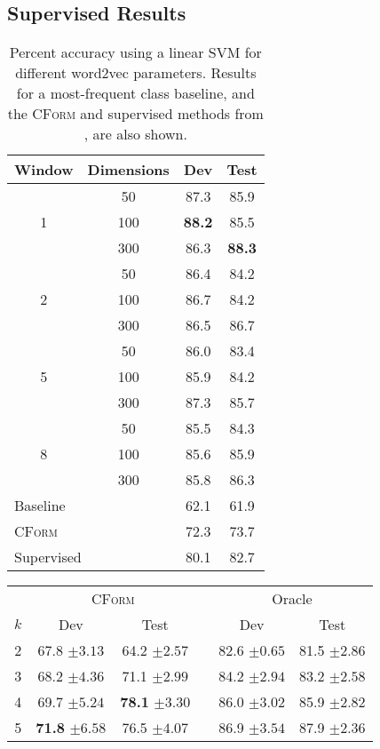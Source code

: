 \documentclass[11pt]{article}
\newcommand{\cform}{\textsc{CForm}\xspace}
\begin{document}
\subsection{Supervised Results}


\begin{table}
\centering
\begin{tabular}{cccc} \hline
Window & Dimensions & Dev & Test \\ 
\hline
  & 50  & 87.3 & 85.9  \\
1 & 100 & \textbf{88.2} & 85.5  \\ 
  & 300 & 86.3 & \textbf{88.3}  \\ 
\hline
  & 50  & 86.4 & 84.2  \\
2 & 100 & 86.7 & 84.2   \\ 
  & 300 & 86.5 & 86.7  \\ 
\hline
  & 50  & 86.0 & 83.4  \\
5 & 100 & 85.9 & 84.2  \\ 
  & 300 & 87.3 & 85.7  \\ 
\hline
  & 50  & 85.5 & 84.3  \\
8 & 100 & 85.6 & 85.9  \\ 
  & 300 & 85.8 & 86.3   \\ 
\hline
\multicolumn{2}{l}{Baseline} & 62.1 & 61.9\\
\multicolumn{2}{l}{\cite{Fazly2009} \cform} & 72.3 & 73.7\\
\multicolumn{2}{l}{\cite{Fazly2009} Supervised} & 80.1 & 82.7 \\
\hline
\end{tabular}
\caption{Percent accuracy using a linear SVM for different word2vec
  parameters. Results for a most-frequent class baseline, and the
  \cform and supervised methods from \cite{Fazly2009}, are also
  shown.\label{tab:sup-vnc}}
\end{table}

\begin{table*}
\centering
\begin{tabular}{cccccc} 
& \multicolumn{2}{c}{\cform} & & \multicolumn{2}{c}{Oracle} \\
$k$ & Dev & Test & & Dev & Test \\ 
\hline
2 & 67.8 $\pm{3.13}$ & 64.2 $\pm{2.57}$          & & 82.6 $\pm{0.65}$ & 81.5 $\pm{2.86}$ \\
3 & 68.2 $\pm{4.36}$ & 71.1 $\pm{2.99}$          & & 84.2 $\pm{2.94}$ & 83.2 $\pm{2.58}$ \\
4 & 69.7 $\pm{5.24}$ & \textbf{78.1} $\pm{3.30}$ & & 86.0 $\pm{3.02}$ & 85.9 $\pm{2.82}$ \\
5 & \textbf{71.8} $\pm{6.58}$ & 76.5 $\pm{4.07}$ & & 86.9 $\pm{3.54}$ & 87.9 $\pm{2.36}$ \\
\hline
\end{tabular}
\caption{The percent accuracy, and standard deviation, of our
  unsupervised approach incorporating \cform (left), and an oracle
  (right), for differing values of $k$.\label{tab:unsup}}
\end{table*}
\end{document}
